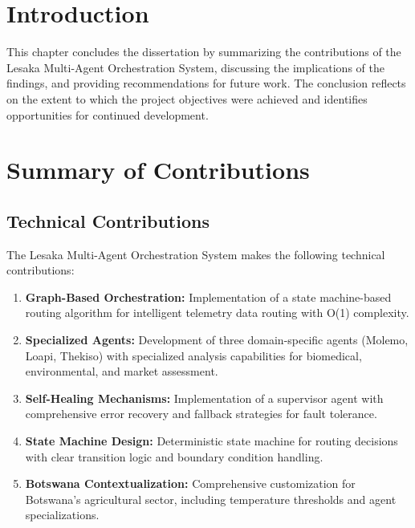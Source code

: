 
\section{Introduction}

This chapter concludes the dissertation by summarizing the contributions of the Lesaka Multi-Agent Orchestration System, discussing the implications of the findings, and providing recommendations for future work. The conclusion reflects on the extent to which the project objectives were achieved and identifies opportunities for continued development.

\section{Summary of Contributions}

\subsection{Technical Contributions}

The Lesaka Multi-Agent Orchestration System makes the following technical contributions:

\begin{enumerate}
    \item \textbf{Graph-Based Orchestration:} Implementation of a state machine-based routing algorithm for intelligent telemetry data routing with O(1) complexity.
    
    \item \textbf{Specialized Agents:} Development of three domain-specific agents (Molemo, Loapi, Thekiso) with specialized analysis capabilities for biomedical, environmental, and market assessment.
    
    \item \textbf{Self-Healing Mechanisms:} Implementation of a supervisor agent with comprehensive error recovery and fallback strategies for fault tolerance.
    
    \item \textbf{State Machine Design:} Deterministic state machine for routing decisions with clear transition logic and boundary condition handling.
    
    \item \textbf{Botswana Contextualization:} Comprehensive customization for Botswana's agricultural sector, including temperature thresholds and agent specializations.
\end{enumerate}


